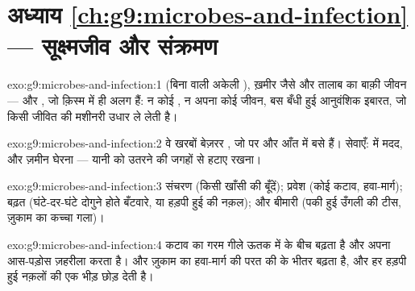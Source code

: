 \section*{अध्याय \ref{ch:g9:microbes-and-infection} --- सूक्ष्मजीव और संक्रमण}

\begin{solution}{exo:g9:microbes-and-infection:1}
 (बिना  वाली अकेली ), ख़मीर जैसे   और
तालाब का बाक़ी  जीवन --- और , जो क़िस्म में ही अलग हैं: न
कोई , न अपना कोई जीवन, बस बँधी हुई आनुवंशिक इबारत, जो किसी जीवित
 की मशीनरी उधार ले लेती है।
\end{solution}

\begin{solution}{exo:g9:microbes-and-infection:2}
वे खरबों बेज़रर , जो  पर और आँत में बसे हैं। सेवाएँ:  में
मदद, और ज़मीन घेरना --- यानी  को उतरने की जगहों से हटाए रखना।
\end{solution}

\begin{solution}{exo:g9:microbes-and-infection:3}
संचरण (किसी खाँसी की बूँदें); प्रवेश (कोई कटाव, हवा-मार्ग); बढ़त
(घंटे-दर-घंटे दोगुने होते बँटवारे, या हड़पी हुई  की नक़ल); और
बीमारी (पकी हुई उँगली की टीस, ज़ुकाम का कच्चा गला)।
\end{solution}

\begin{solution}{exo:g9:microbes-and-infection:4}
कटाव का  गरम गीले ऊतक में  के बीच बढ़ता है और अपना
आस-पड़ोस ज़हरीला करता है। और ज़ुकाम का  हवा-मार्ग की परत की
 के भीतर बढ़ता है, और हर हड़पी हुई  नक़लों की एक भीड़ छोड़
देती है।
\end{solution}

